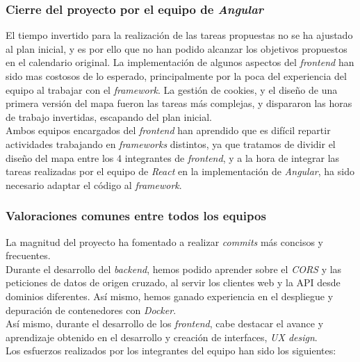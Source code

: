 \documentclass[11pt, a4paper, titlepage]{article}
\begin{document}
\subsubsection{Cierre del proyecto por el equipo de \textit{Angular}}

El tiempo invertido para la realización de las tareas propuestas no se ha ajustado al plan inicial, y es por ello que no han podido alcanzar los objetivos propuestos en el calendario original. La implementación de algunos aspectos del \textit{frontend} han sido mas costosos de lo esperado, principalmente por la poca del experiencia del equipo al trabajar con el \textit{framework}. La gestión de cookies, y el diseño de una primera versión del mapa fueron las tareas más complejas, y dispararon las horas de trabajo invertidas, escapando del plan inicial.
\\

Ambos equipos encargados del \textit{frontend} han aprendido que es difícil repartir actividades trabajando en \textit{frameworks} distintos, ya que tratamos de dividir el diseño del mapa entre los 4 integrantes de \textit{frontend}, y a la hora de integrar las tareas realizadas por el equipo de \textit{React} en la implementación de \textit{Angular}, ha sido necesario adaptar el código al \textit{framework}. \\
\subsubsection{Valoraciones comunes entre todos los equipos}

La magnitud del proyecto ha fomentado a realizar \textit{commits} más concisos y frecuentes. \\

Durante el desarrollo del \textit{backend}, hemos podido aprender sobre el \textit{CORS} y las peticiones de datos de origen cruzado, al servir los clientes web y la API desde dominios diferentes. Así mismo, hemos ganado experiencia en el despliegue y depuración de contenedores con \textit{Docker}. \\

Así mismo, durante el desarrollo de los \textit{frontend}, cabe destacar el avance y aprendizaje obtenido en el desarrollo y creación de interfaces, \textit{UX design}.\\

Los esfuerzos realizados por los integrantes del equipo han sido los siguientes:
\end{document}
